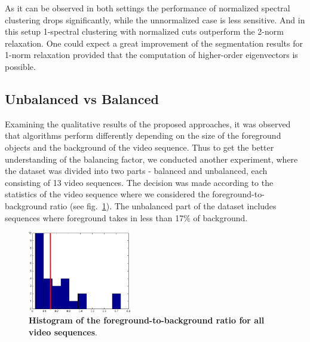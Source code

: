 As it can be observed in both settings the performance of normalized spectral clustering drops significantly, while the unnormalized case is less sensitive. 
And in this setup 1-spectral clustering with normalized cuts outperform the 2-norm relaxation. One could expect a great improvement of the segmentation results for 1-norm relaxation provided that the computation of higher-order
eigenvectors is possible.
\subsection{Unbalanced vs Balanced}
Examining the qualitative results of the proposed approaches, it was observed that algorithms perform differently depending on the size of the foreground objects and the background of the video sequence. Thus to get the 
better understanding
of the balancing factor, we conducted another experiment, where the dataset was divided into two parts - balanced and unbalanced, each consisting of 13 video sequences.
The decision was made according to the statistics of the video sequence where we considered the foreground-to-background ratio (see fig.~\ref{fig:hist}). The unbalanced part of the dataset includes
sequences where foreground takes in less than 17\% of background.
\begin{figure}[!h]
\centering
\includegraphics[width=0.4\textwidth]{images/1.png}
\caption[Histogram of the foreground-to-background ratio for all video sequences]{
{\bf Histogram of the foreground-to-background ratio for all video sequences}.}
\label{fig:hist}
\end{figure}

